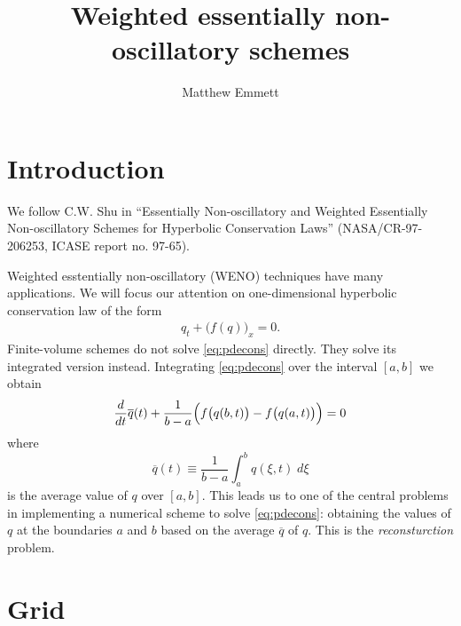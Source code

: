 \documentclass{article}
\newcommand{\dd}[2]{\frac{d #1}{d #2}}
\numberwithin{equation}{section}
\begin{document}
\title{Weighted essentially non-oscillatory schemes}
\author{Matthew Emmett}
\maketitle


\section{Introduction}

We follow C.W. Shu in ``Essentially Non-oscillatory and Weighted
Essentially Non-oscillatory Schemes for Hyperbolic Conservation Laws''
(NASA/CR-97-206253, ICASE report no. 97-65).

Weighted esstentially non-oscillatory (WENO) techniques have many
applications.  We will focus our attention on one-dimensional
hyperbolic conservation law of the form
\begin{gather}
  \label{eq:pdecons}
  q_t + \bigl( f(q) \bigr)_x = 0.
\end{gather}
Finite-volume schemes do not solve \eqref{eq:pdecons} directly.  They
solve its integrated version instead.  Integrating \eqref{eq:pdecons}
over the interval $[a,b]$ we obtain
\begin{equation*}
  \dd{}{t} \overline{q}(t)
    + \frac{1}{b - a} \Bigl( f\bigl(q(b,t)\bigr)
                                - f\bigl(q(a,t)\bigr) \Bigr) = 0
\end{equation*}
where
\begin{equation*}
  \overline{q}(t)
    \equiv \frac{1}{b - a} \int_{a}^{b} q(\xi,t) \;d\xi
\end{equation*}
is the average value of $q$ over $[a,b]$.  This leads us to one of
the central problems in implementing a numerical scheme to solve
\eqref{eq:pdecons}: obtaining the values of $q$ at the boundaries $a$
and $b$ based on the average $\overline{q}$ of $q$.  This is the
\emph{reconsturction} problem.

\newpage
\section{Grid}
\end{document}
